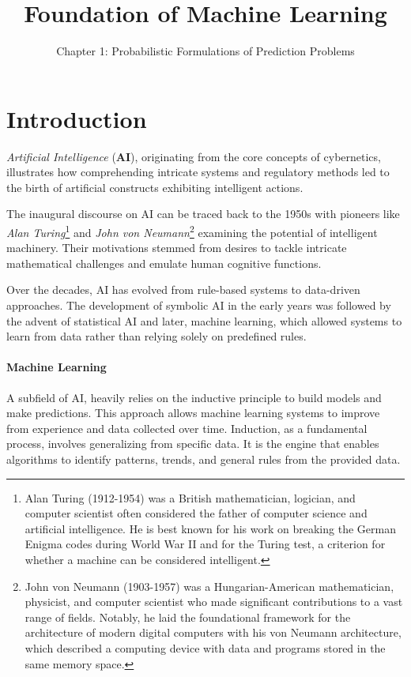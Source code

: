 \documentclass[11pt]{article}
\title{Foundation of Machine Learning}
\subtitle{Chapter 1: Probabilistic Formulations of Prediction Problems}
\begin{document}
    \maketitle
    \tableofcontents
    \vspace{5mm}


    \section{Introduction}

    \textit{Artificial Intelligence} (\textbf{AI}), originating from the core concepts of cybernetics, illustrates how comprehending intricate systems and regulatory methods led to the birth of artificial constructs exhibiting intelligent actions.

    The inaugural discourse on AI can be traced back to the 1950s with pioneers like \textit{Alan Turing}\footnote{Alan Turing (1912-1954) was a British mathematician, logician, and computer scientist often considered the father of computer science and artificial intelligence. He is best known for his work on breaking the German Enigma codes during World War II and for the Turing test, a criterion for whether a machine can be considered intelligent.} and \textit{John von Neumann}\footnote{John von Neumann (1903-1957) was a Hungarian-American mathematician, physicist, and computer scientist who made significant contributions to a vast range of fields. Notably, he laid the foundational framework for the architecture of modern digital computers with his von Neumann architecture, which described a computing device with data and programs stored in the same memory space.} examining the potential of intelligent machinery. Their motivations stemmed from desires to tackle intricate mathematical challenges and emulate human cognitive functions.

    Over the decades, AI has evolved from rule-based systems to data-driven approaches. The development of symbolic AI in the early years was followed by the advent of statistical AI and later, machine learning, which allowed systems to learn from data rather than relying solely on predefined rules.

    \paragraph{Machine Learning}A subfield of AI, heavily relies on the inductive principle to build models and make predictions. This approach allows machine learning systems to improve from experience and data collected over time. Induction, as a fundamental process, involves generalizing from specific data. It is the engine that enables algorithms to identify patterns, trends, and general rules from the provided data.
\end{document}
